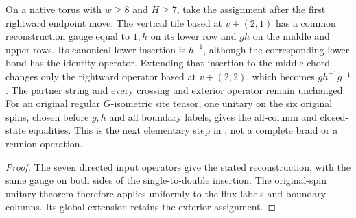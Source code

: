 \begin{lemma}
    \label{thm:peps_second_string_physical_crossing}
    \leanok
    On a native torus with $w\ge8$ and $H\ge7$, take the assignment
    after the first rightward endpoint move. The vertical tile based at
    $v+(2,1)$ has a common reconstruction gauge equal to $1,h$ on its lower
    row and $gh$ on the middle and upper rows. Its canonical lower insertion
    is $h^{-1}$, although the corresponding lower bond has the identity
    operator. Extending that insertion to the middle chord changes only the
    rightward operator based at $v+(2,2)$, which becomes $gh^{-1}g^{-1}$.
    The partner string and every crossing and exterior operator remain
    unchanged. For an original regular $G$-isometric site tensor, one unitary
    on the six original spins, chosen before $g,h$ and all boundary labels,
    gives the all-column and closed-state equalities. This is the next
    elementary step in \cite[Section~6.6]{Schuch2010PEPS}, not a complete braid
    or a reunion operation.
\end{lemma}
\begin{proof}
    \leanok
    The seven directed input operators give the stated reconstruction, with
    the same gauge on both sides of the single-to-double insertion. The
    original-spin unitary theorem therefore applies uniformly to the flux
    labels and boundary columns. Its global extension retains the
    exterior assignment.
\end{proof}
